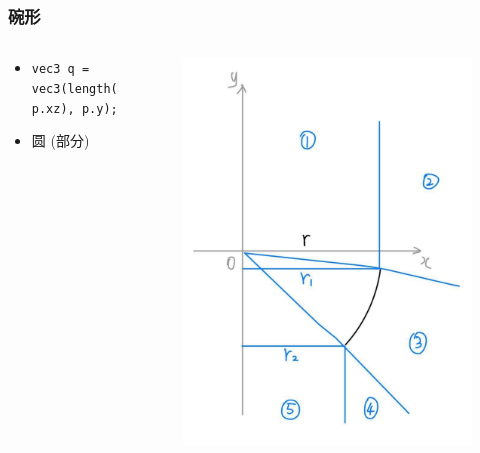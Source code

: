 \documentclass[aspectratio=169]{ctexbeamer} %
\begin{document}
\begin{frame}
    \frametitle{碗形} %
    \begin{columns}
        \begin{column}{.6\textwidth}
            \begin{itemize}[<+->]
                \item \texttt{vec3 q = vec3(length(p.xz), p.y);}
                \item 圆 (部分)
            \end{itemize}
        \end{column}
        \begin{column}{.4\textwidth}
            \begin{figure}[htbp]
                \centering
                \includegraphics[height=.65\textheight]{images/pre/bowl_derive.pdf}
                \caption{}
                \label{fig:bowl_derive}
            \end{figure}
        \end{column}
    \end{columns}
\end{frame}
\end{document}
